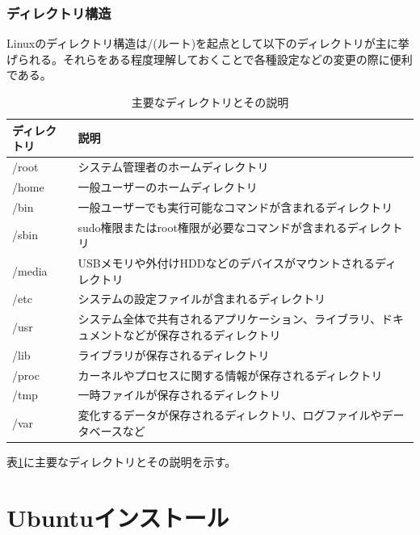 \documentclass[a4paper, 11pt, dvipdfmx]{jsarticle}
\begin{document}
  \subsubsection{ディレクトリ構造}
  Linuxのディレクトリ構造は/(ルート)を起点として以下のディレクトリが主に挙げられる。それらをある程度理解しておくことで各種設定などの変更の際に便利である。\\
  \begin{table}[h]
    \centering
    \begin{tabular}{|l|l|}
      \hline
      ディレクトリ & 説明 \\ \hline
      /root & システム管理者のホームディレクトリ \\ \hline
      /home & 一般ユーザーのホームディレクトリ \\ \hline
      /bin & 一般ユーザーでも実行可能なコマンドが含まれるディレクトリ \\ \hline
      /sbin & sudo権限またはroot権限が必要なコマンドが含まれるディレクトリ \\ \hline
      /media & USBメモリや外付けHDDなどのデバイスがマウントされるディレクトリ \\ \hline
      /etc & システムの設定ファイルが含まれるディレクトリ \\ \hline
      /usr & システム全体で共有されるアプリケーション、ライブラリ、ドキュメントなどが保存されるディレクトリ \\ \hline
      /lib & ライブラリが保存されるディレクトリ \\ \hline
      /proc & カーネルやプロセスに関する情報が保存されるディレクトリ \\ \hline
      /tmp & 一時ファイルが保存されるディレクトリ \\ \hline
      /var & 変化するデータが保存されるディレクトリ、ログファイルやデータベースなど \\ \hline
    \end{tabular}
    \caption{主要なディレクトリとその説明}
    \label{tab:directories}
  \end{table}
  表\ref{tab:directories}に主要なディレクトリとその説明を示す。


\section{Ubuntuインストール}
\end{document}
